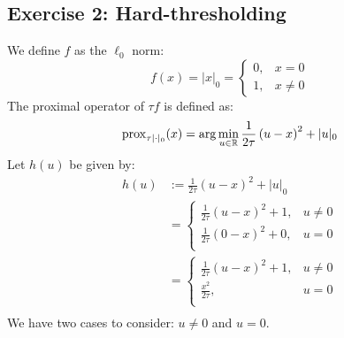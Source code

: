 \documentclass[12pt]{article}
\newcommand{\prox}{\operatorname{prox}}
\begin{document}
\subsection{Exercise 2: Hard-thresholding}
We define $f$ as the $\ell_0$ norm:
\begin{equation*}
  f(x) = |x|_0 = \begin{cases}
    0, & x = 0    \\
    1, & x \neq 0
  \end{cases}
\end{equation*}
The proximal operator of $\tau f$ is defined as:
\begin{equation*}
  \prox_{\tau |\cdot|_0}(x) = \arg\min_{u \in \R} \frac{1}{2\tau}\left(u-x \right)^2 + |u|_0
\end{equation*}
Let $h(u)$ be given by:
\begin{align*}
  h(u)
   & := \frac{1}{2\tau}\left(u-x \right)^2 + |u|_0 \\
   & =
  \begin{cases}
    \frac{1}{2\tau} \left(u-x \right)^2 + 1,  & u \neq 0 \\
    \frac{1}{2\tau} \left( 0-x \right)^2 + 0, & u = 0    \\
  \end{cases}                       \\
   & =
  \begin{cases}
    \frac{1}{2\tau} \left(u-x \right)^2 + 1, & u \neq 0 \\
    \frac{x^2}{2\tau},                       & u = 0    \\
  \end{cases}                       \\
\end{align*}
We have two cases to consider: $u \neq 0$ and $u = 0$.
\end{document}
